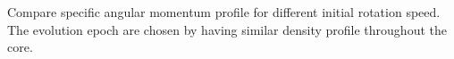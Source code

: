 \label{Fig:compRot}

Compare specific angular momentum profile for different initial rotation speed. The evolution epoch are chosen by having similar density profile throughout the core.